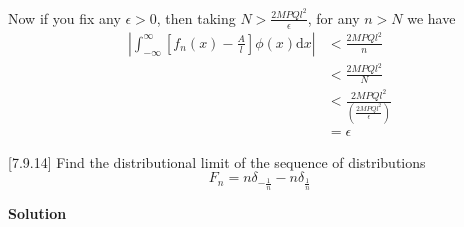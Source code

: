 \documentclass{article}
\begin{document}
%
Now if you fix any $\epsilon > 0$, then taking
$N > \frac{2 M P Q l^2}{\epsilon}$, for any $n > N$ we have
%
\begin{align*}
    \left| \int_{-\infty}^{\infty} \left[ f_n(x) - \frac{A}{l} \right] \phi(x) \mathrm{d} x \right|
        &< \frac{2 M P Q l^2}{n} \\
        &< \frac{2 M P Q l^2}{N} \\
        &< \frac{2 M P Q l^2}{\left(\frac{2 M P Q l^2}{\epsilon}\right)} \\
        &= \epsilon
\end{align*}

\vspace{5mm}

[7.9.14] Find the distributional limit of the sequence of distributions
%
\begin{equation*}
    F_n = n \delta_{- \frac{1}{n}} - n \delta_{\frac{1}{n}}
\end{equation*}

\textbf{Solution}
\end{document}

